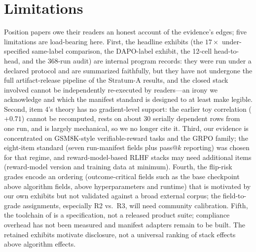 \section{Limitations}
\label{sec:p5-limitations}
Position papers owe their readers an honest account of the evidence's edges;
five limitations are load-bearing here. First, the headline exhibits
(the $17\times$ under-specified same-label comparison, the DAPO-label exhibit, the
12-cell head-to-head, and the 368-run audit) are internal program records:
they were run under a declared protocol and are summarized faithfully, but
they have not undergone the full artifact-release pipeline of the \ours{}
Stratum-A results, and the closed stack involved cannot be independently
re-executed by readers---an irony we acknowledge and which the manifest
standard is designed to at least make legible. Second, item 4's theory has no
gradient-level support: the earlier toy correlation ($+0.71$) cannot be
recomputed, rests on about 30 serially dependent rows from one run, and is
largely mechanical, so we no longer cite it. Third, our evidence is concentrated on GSM8K-style
verifiable-reward tasks and the GRPO family; the eight-item standard (seven
run-manifest fields plus pass@$k$ reporting) was chosen for that regime, and
reward-model-based RLHF stacks may need additional items
(reward-model version and training data at minimum). Fourth, the flip-risk
grades encode an ordering (outcome-critical fields such as the base
checkpoint above algorithm fields, above hyperparameters and runtime) that is
motivated by our own exhibits but not validated against a broad external
corpus; the field-to-grade assignments, especially R2 vs.\ R3, will need
community calibration. Fifth, the toolchain of  is a
specification, not a released product suite; compliance overhead has not
been measured and manifest adapters remain to be built. The retained
exhibits motivate disclosure, not a universal ranking of stack effects
above algorithm effects.
